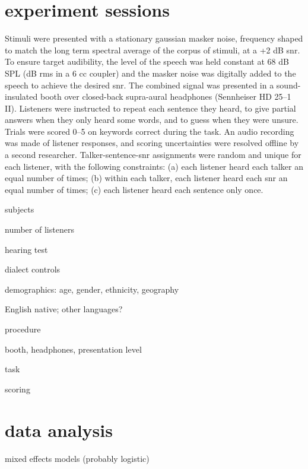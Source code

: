 \section{experiment sessions}
Stimuli were presented with a stationary gaussian masker noise, frequency shaped to match the long term spectral average of the corpus of stimuli, at a +2 dB \ac{snr}.  To ensure target audibility, the level of the speech was held constant at 68 dB SPL (dB \ac{rms} in a 6 cc coupler) and the masker noise was digitally added to the speech to achieve the desired \ac{snr}.  The combined signal was presented in a sound-insulated booth over closed-back supra-aural headphones (Sennheiser HD 25–1 II).  Listeners were instructed to repeat each sentence they heard, to give partial answers when they only heard some words, and to guess when they were unsure.  Trials were scored 0–5 on keywords correct during the task.  An audio recording was made of listener responses, and scoring uncertainties were resolved offline by a second researcher.  Talker-sentence-\ac{snr} assignments were random and unique for each listener, with the following constraints: (a) each listener heard each talker an equal number of times; (b) within each talker, each listener heard each \ac{snr} an equal number of times; (c) each listener heard each sentence only once.

\begin{itm}
	\item{subjects}
	\begin{itm}
		\item{number of listeners}
		\item{hearing test}
		\item{dialect controls}
		\item{demographics: age, gender, ethnicity, geography}
		\item{English native; other languages?}
	\end{itm}
	\item{procedure}
	\begin{itm}
		\item{booth, headphones, presentation level}
		\item{task}
		\item{scoring}
	\end{itm}
\end{itm}

\section{data analysis}
\begin{itm}
	\item{mixed effects models (probably logistic)}
\end{itm}
